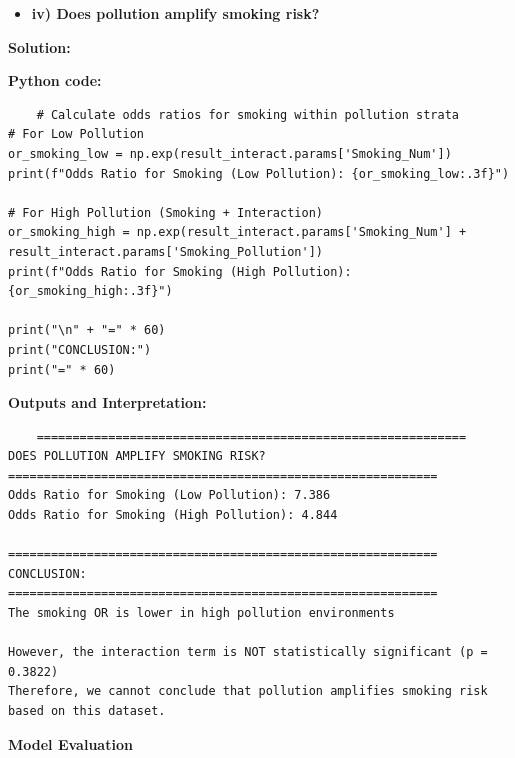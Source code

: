 \documentclass[12pt]{article}
\begin{document}
\begin{itemize}
    \item\textbf{iv) Does pollution amplify smoking risk?}
\end{itemize}

{\large\textbf{Solution:}}

\vspace{0.3cm}

{\large\textbf{Python code:}}

\vspace{0.3cm}

\begin{verbatim}
    # Calculate odds ratios for smoking within pollution strata
# For Low Pollution
or_smoking_low = np.exp(result_interact.params['Smoking_Num'])
print(f"Odds Ratio for Smoking (Low Pollution): {or_smoking_low:.3f}")

# For High Pollution (Smoking + Interaction)
or_smoking_high = np.exp(result_interact.params['Smoking_Num'] + result_interact.params['Smoking_Pollution'])
print(f"Odds Ratio for Smoking (High Pollution): {or_smoking_high:.3f}")

print("\n" + "=" * 60)
print("CONCLUSION:")
print("=" * 60)

\end{verbatim}

{\textbf{Outputs and Interpretation:}}

\vspace{0.4cm}

\begin{verbatim}
    ============================================================
DOES POLLUTION AMPLIFY SMOKING RISK?
============================================================
Odds Ratio for Smoking (Low Pollution): 7.386
Odds Ratio for Smoking (High Pollution): 4.844

============================================================
CONCLUSION:
============================================================
The smoking OR is lower in high pollution environments

However, the interaction term is NOT statistically significant (p = 0.3822)
Therefore, we cannot conclude that pollution amplifies smoking risk
based on this dataset.

\end{verbatim}

\vspace{1.5cm}

{\large \textbf{Model Evaluation}}

\vspace{0.3cm}
\end{document}
